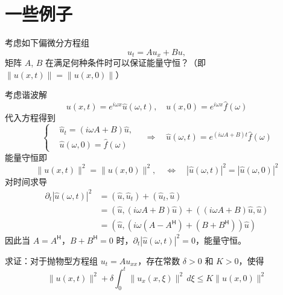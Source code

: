 \section{一些例子}

\begin{example}
    考虑如下偏微分方程组
    \[
        u_t = A u_x + B u,
    \]
    矩阵 $A$, $B$ 在满足何种条件时可以保证能量守恒？（即 $\|u(x,t)\| = \|u(x,0)\|$）
\end{example}

\begin{solution*}
    考虑谐波解
    \[
        u(x,t) = e^{i \omega x} \hat{u}(\omega,t),\quad
        u(x,0) = e^{i \omega x} \hat{f}(\omega)
    \]
    代入方程得到
    \[
        \left\{
        \begin{aligned}
             & \hat{u}_t = (i \omega A + B) \hat{u}, \\
             & \hat{u}(\omega,0) = \hat{f}(\omega)
        \end{aligned}
        \right.
        \quad \Rightarrow \quad
        \hat{u}(\omega,t) = e^{(i \omega A + B)t}\hat{f}(\omega)
    \]
    能量守恒即
    \[
        \| u(x,t) \|^2 =\| u(x,0) \|^2, \quad
        \iff \quad |\hat{u}( \omega,t)|^2 = |\hat{u}( \omega,0)|^2
    \]
    对时间求导
    \begin{align*}
        \partial_t |\hat{u}( \omega,t)|^2
         & = (\hat{u},\hat{u}_t) + (\hat{u}_t,\hat{u})                               \\
         & = (\hat{u},(i \omega A + B) \hat{u}) + ((i \omega A + B) \hat{u},\hat{u}) \\
         & = (\hat{u},(i \omega (A - A^\mathsf{H}) + (B + B^\mathsf{H}))\hat{u})
    \end{align*}
    因此当 $A=A^\mathsf{H}$，$B+B^\mathsf{H}=0$ 时，$\partial_t |\hat{u}( \omega,t)|^2=0$，能量守恒。
\end{solution*}

\begin{example}\label{eg:well-posed-1}
    求证：对于抛物型方程组 $u_t = A u_{xx}$，存在常数 $\delta > 0$ 和 $K > 0$，使得
    \[
        \| u(x,t) \|^2 + \delta \int_0^t \| u_x(x,\xi) \|^2 \,d\xi \le K \| u(x,0) \|^2
    \]
\end{example}

